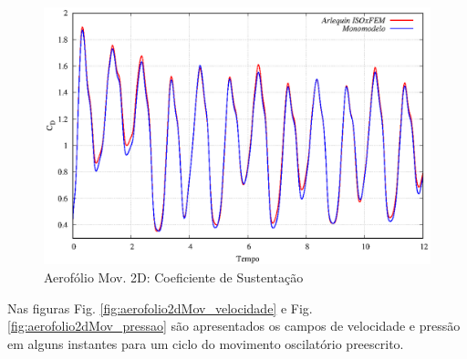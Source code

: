 \documentclass[tese_patricia]{subfiles}
\begin{document}
\begin{figure}[htb!]
	\centering 
	\includegraphics[scale=1.0,trim=0cm 0cm 0cm 0cm, clip=true]{Imagens/Cap6/LiftMov.eps}	
	\caption{Aerofólio Mov. 2D: Coeficiente de Sustentação}
	\label{fig:AeroLiftMov}
\end{figure}

Nas figuras Fig. \ref{fig:aerofolio2dMov_velocidade} e Fig. \ref{fig:aerofolio2dMov_pressao} são apresentados os campos de velocidade e pressão em alguns instantes para um ciclo do movimento oscilatório preescrito.
\end{document}
